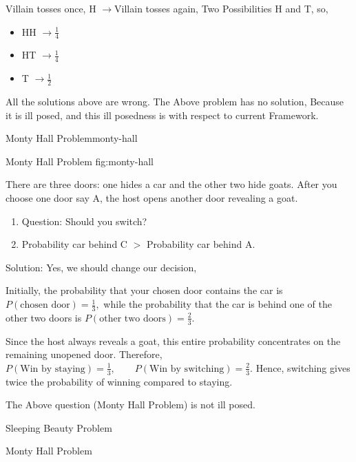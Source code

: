 Villain tosses once, H \(\to \)Villain tosses again, Two Possibilities H and T, so,

\begin{itemize}
    \item HH \(\to \frac{1}{4}\)
    \item HT \(\to \frac{1}{4}\)
    \item T \(\to \frac{1}{2}\)
\end{itemize}
\begin{important}
All the solutions above are wrong.
The Above problem has no solution, Because it is ill posed, and this ill posedness is with respect to current Framework.

\end{important}


\begin{question}{Monty Hall Problem}{monty-hall}

    {Monty Hall Problem}
    {fig:monty-hall}


    There are three doors: one hides a car and the other two hide goats. After you choose one door say A, the host opens another door revealing a goat.
\begin{enumerate}
    \item Question: Should you switch? 
    \item Probability car behind C \(>\) Probability car behind A.
\end{enumerate}

\end{question}
Solution:  Yes,  we should change our decision, 

Initially, the probability that your chosen door contains the car is
\(
P(\text{chosen door})=\frac{1}{3},
\)
while the probability that the car is behind one of the other two doors is
\(
P(\text{other two doors})=\frac{2}{3}.
\)

Since the host always reveals a goat, this entire probability concentrates on the remaining unopened door. Therefore,
\(
P(\text{Win by staying})=\frac{1}{3}, \qquad
P(\text{Win by switching})=\frac{2}{3}.
\)
Hence, switching gives twice the probability of winning compared to staying.
\begin{remark}

    The Above question (Monty Hall Problem) is not ill posed.

\end{remark}

\begin{lecturesummary}

\item Sleeping Beauty Problem

\item Monty Hall Problem

\end{lecturesummary}

\lectureend
